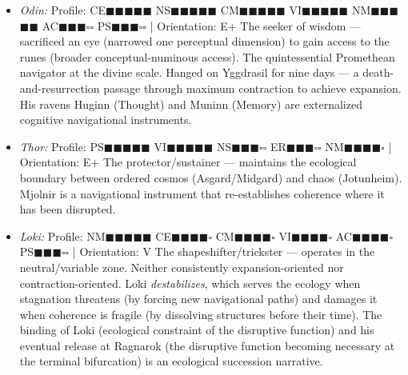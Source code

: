 \begin{itemize}[nosep,leftmargin=*]
  \item \textit{Odin:} Profile: CE$\blacksquare$$\blacksquare$$\blacksquare$$\blacksquare$$\blacksquare$ NS$\blacksquare$$\blacksquare$$\blacksquare$$\blacksquare$$\blacksquare$ CM$\blacksquare$$\blacksquare$$\blacksquare$$\blacksquare$$\blacksquare$ VI$\blacksquare$$\blacksquare$$\blacksquare$$\blacksquare$$\blacksquare$ NM$\blacksquare$$\blacksquare$$\blacksquare$$\blacksquare$$\blacksquare$ AC$\blacksquare$$\blacksquare$$\blacksquare$$\square$$\square$ PS$\blacksquare$$\blacksquare$$\blacksquare$$\square$$\square$ | Orientation: E+ The seeker of wisdom — sacrificed an eye (narrowed one perceptual dimension) to gain access to the runes (broader conceptual-numinous access). The quintessential Promethean navigator at the divine scale. Hanged on Yggdrasil for nine days — a death-and-resurrection passage through maximum contraction to achieve expansion. His ravens Huginn (Thought) and Muninn (Memory) are externalized cognitive navigational instruments.
  \item \textit{Thor:} Profile: PS$\blacksquare$$\blacksquare$$\blacksquare$$\blacksquare$$\blacksquare$ VI$\blacksquare$$\blacksquare$$\blacksquare$$\blacksquare$$\blacksquare$ NS$\blacksquare$$\blacksquare$$\blacksquare$$\square$$\square$ ER$\blacksquare$$\blacksquare$$\blacksquare$$\square$$\square$ NM$\blacksquare$$\blacksquare$$\blacksquare$$\blacksquare$$\square$ | Orientation: E+ The protector/\allowbreak sustainer — maintains the ecological boundary between ordered cosmos (Asgard/\allowbreak Midgard) and chaos (Jotunheim). Mjolnir is a navigational instrument that re-establishes coherence where it has been disrupted.
  \item \textit{Loki:} Profile: NM$\blacksquare$$\blacksquare$$\blacksquare$$\blacksquare$$\blacksquare$ CE$\blacksquare$$\blacksquare$$\blacksquare$$\blacksquare$$\square$ CM$\blacksquare$$\blacksquare$$\blacksquare$$\blacksquare$$\square$ VI$\blacksquare$$\blacksquare$$\blacksquare$$\blacksquare$$\square$ AC$\blacksquare$$\blacksquare$$\blacksquare$$\blacksquare$$\square$ PS$\blacksquare$$\blacksquare$$\blacksquare$$\square$$\square$ | Orientation: V The shapeshifter/\allowbreak trickster — operates in the neutral/\allowbreak variable zone. Neither consistently expansion-oriented nor contraction-oriented. Loki \textit{destabilizes}, which serves the ecology when stagnation threatens (by forcing new navigational paths) and damages it when coherence is fragile (by dissolving structures before their time). The binding of Loki (ecological constraint of the disruptive function) and his eventual release at Ragnarok (the disruptive function becoming necessary at the terminal bifurcation) is an ecological succession narrative.
\end{itemize}


